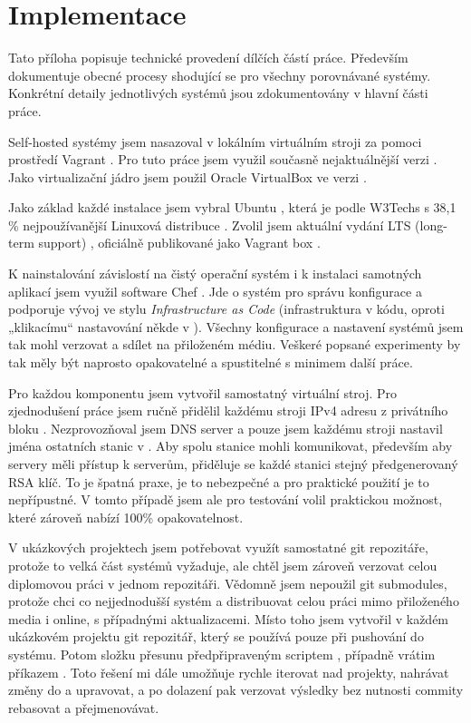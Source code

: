 \chapter{Implementace}\label{ch:implementace}

Tato příloha popisuje technické provedení dílčích částí práce. Především dokumentuje obecné procesy shodující se pro všechny porovnávané \CICD systémy. Konkrétní detaily jednotlivých systémů jsou zdokumentovány v hlavní části práce.

Self-hosted \CICD systémy jsem nasazoval v lokálním virtuálním stroji za pomoci prostředí Vagrant \cite{hashimoto-vagrant}\cite{susanka-vagrant}. Pro tuto práce jsem využil současně nejaktuálnější verzi . Jako virtualizační jádro jsem použil Oracle VirtualBox \cite{virtualbox} ve verzi .

Jako základ každé instalace jsem vybral Ubuntu \cite{ubuntu}, která je podle W3Techs s 38,1 \% nejpoužívanější Linuxová distribuce \cite{w3techs-stats}. Zvolil jsem aktuální vydání LTS (long-term support) , oficiálně publikované jako Vagrant box .

K nainstalování závislostí na čistý operační systém i k instalaci samotných aplikací jsem využil software Chef \cite{chef}. Jde o systém pro správu konfigurace a podporuje vývoj ve stylu \textit{Infrastructure as Code} (infrastruktura v kódu, oproti „klikacímu“ nastavování někde v ). Všechny konfigurace a nastavení systémů jsem tak mohl verzovat a sdílet na přiloženém médiu. Veškeré popsané experimenty by tak měly být naprosto opakovatelné a spustitelné s minimem další práce.

Pro každou komponentu jsem vytvořil samostatný virtuální stroj. Pro zjednodušení práce jsem ručně přidělil každému stroji IPv4 adresu z privátního bloku . Nezprovozňoval jsem DNS server a pouze jsem každému stroji nastavil jména ostatních stanic v . Aby spolu stanice mohli komunikovat, především aby \CD servery měli přístup k \HTTP serverům, přiděluje se každé stanici stejný předgenerovaný RSA klíč. To je špatná praxe, je to nebezpečné a pro praktické použití je to nepřípustné. V tomto případě jsem ale pro testování volil praktickou možnost, které zároveň nabízí 100\% opakovatelnost.

V ukázkových projektech jsem potřebovat využít samostatné git repozitáře, protože to velká část \CICD systémů vyžaduje, ale chtěl jsem zároveň verzovat celou diplomovou práci v jednom repozitáři. Vědomně jsem nepoužil git submodules, protože chci co nejjednodušší systém a distribuovat celou práci mimo přiloženého media i online, s případnými aktualizacemi. Místo toho jsem vytvořil v každém ukázkovém projektu git repozitář, který se používá pouze při pushování do \CICD systému. Potom složku  přesunu předpřipraveným scriptem , případně vrátim příkazem . Toto řešení mi dále umožňuje rychle iterovat nad projekty, nahrávat změny do \CICD a upravovat, a po dolazení pak verzovat výsledky bez nutnosti commity rebasovat a přejmenovávat.

